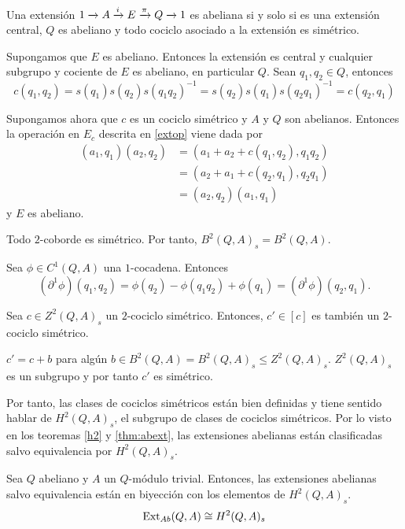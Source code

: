 \begin{teorema}\label{thm:abext}
	Una extensión $\extension i \pi A E Q$ es abeliana si y solo si es una extensión central, $Q$ es abeliano y todo cociclo asociado a la extensión es simétrico.
	\begin{demostracion}
		Supongamos que $E$ es abeliano. Entonces la extensión es central y cualquier subgrupo y cociente de $E$ es abeliano, en particular $Q$. Sean $q_1,q_2\in Q$, entonces
		\begin{equation*}
			c(q_1,q_2)=s(q_1)s(q_2)s(q_1q_2)^{-1} = s(q_2)s(q_1)s(q_2q_1)^{-1} = c(q_2,q_1) %
		\end{equation*}
		
		Supongamos ahora que $c$ es un cociclo simétrico y $A$ y $Q$ son abelianos. Entonces la operación en $E_c$ descrita en \ref{extop} viene dada por 
		\begin{align*}
			(a_1,q_1)(a_2,q_2) 
			& = (a_1+a_2 + c(q_1,q_2),q_1q_2) \\
			& = (a_2+a_1 + c(q_2,q_1),q_2q_1) \\
			& = (a_2,q_2)(a_1,q_1)
		\end{align*}
		y $E$ es abeliano.
	\end{demostracion}
\end{teorema}

\begin{proposicion}
		Todo $2$-coborde es simétrico. Por tanto, $B^2(Q,A)_s=B^2(Q,A)$.
	\begin{demostracion}
		Sea $\phi\in C^1(Q,A)$ una $1$-cocadena. Entonces
		\begin{equation*}
			(\partial^1\phi)(q_1,q_2) = \phi(q_2) - \phi(q_1q_2) + \phi(q_1) = (\partial^1\phi)(q_2,q_1).
		\end{equation*}
	\end{demostracion}
\end{proposicion}

\begin{corolario}
	Sea $c\in Z^2(Q,A)_s$ un $2$-cociclo simétrico. Entonces, $c'\in [c]$ es también un $2$-cociclo simétrico.
	\begin{demostracion}
		$c' = c+b$ para algún $b\in B^2(Q,A)=B^2(Q,A)_s\leq Z^2(Q,A)_s$. $Z^2(Q,A)_s$ es un subgrupo y por tanto $c'$ es simétrico.
	\end{demostracion}
\end{corolario}

Por tanto, las clases de cociclos simétricos están bien definidas y tiene sentido hablar de $H^2(Q,A)_s$, el subgrupo de clases de cociclos simétricos. Por lo visto en los teoremas \ref{h2} y \ref{thm:abext}, las extensiones abelianas están clasificadas  salvo equivalencia por $H^2(Q,A)_s$.

\begin{teorema}
	Sea $Q$ abeliano y $A$ un $Q$-módulo trivial. Entonces, las extensiones abelianas salvo equivalencia están en biyección con los elementos de $H^2(Q,A)_s$.
	\begin{equation*}
		\ExtFunctor_{Ab}(Q,A) \cong H^2(Q,A)_s
	\end{equation*}
\end{teorema}